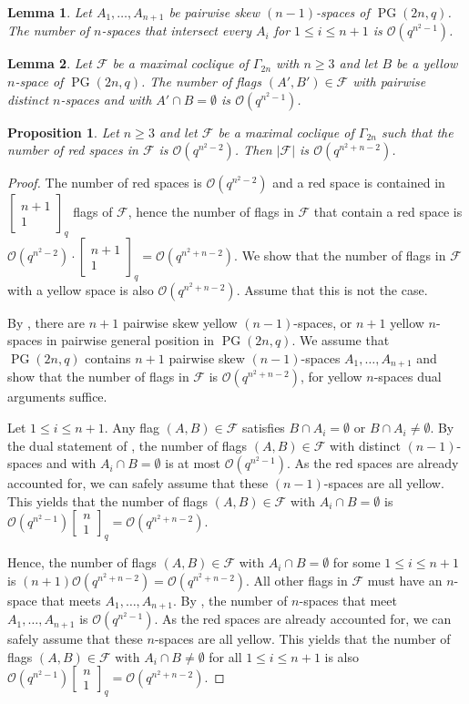 \documentclass[10pt,a4paper]{amsart}
\newtheorem{lemma}{Lemma}
\newtheorem{prop}{Proposition}
\newcommand{\EKR}{\mathcal{F}}
\newcommand{\Gauss}[2]{{\begin{bmatrix} #1 \\ #2 \end{bmatrix}_q}}
\newcommand{\OO}{\mathcal{O}}
\DeclareMathOperator{\PG}{PG}
\begin{document}
\begin{lemma} \label{L: few that meet all}
 Let $A_1,\ldots,A_{n+1}$ be pairwise skew $(n-1)$-spaces of $\PG(2n,q)$. The number of $n$-spaces that intersect every $A_i$ for $1\leq i\leq n+1$ is $\OO(q^{n^2-1})$.
\end{lemma}

\begin{lemma} \label{L: yellows meet almost all}
    Let $\EKR$ be a maximal coclique of $\Gamma_{2n}$ with $n\geq 3$ and let $B$ be a yellow $n$-space of $\PG(2n,q)$. The number of flags $(A',B')\in \EKR$ with pairwise distinct $n$-spaces and with $A'\cap B=\emptyset$ is $\OO(q^{n^2-1})$.
\end{lemma}

\begin{prop}
Let $n\geq 3$ and let $\EKR$ be a maximal coclique of $\Gamma_{2n}$ such that the number of red spaces in $\EKR$ is $\OO(q^{n^2-2})$. Then $|\EKR|$ is $\OO(q^{n^2+n-2})$.
\end{prop}

\begin{proof}
 The number of red spaces is $\OO(q^{n^2-2})$ and a red space is contained in $\Gauss{n+1}{1}$ flags of $\EKR$, hence the number of flags in $\EKR$ that contain a red space is $\OO(q^{n^2-2})\cdot \Gauss{n+1}{1}=\OO(q^{n^2+n-2})$. 
   We show that the number of flags in $\EKR$ with a yellow space is also $\OO(q^{n^2+n-2})$. Assume that this is not the case.

     By , there are $n+1$ pairwise skew yellow $(n-1)$-spaces, or $n+1$ yellow $n$-spaces in pairwise general position in $\PG(2n,q)$. We assume that $\PG(2n,q)$ contains $n+1$ pairwise skew $(n-1)$-spaces $A_1,\ldots,A_{n+1}$ and show that the number of flags in $\EKR$ is $\OO(q^{n^2+n-2})$, for yellow $n$-spaces dual arguments suffice.
     
     Let $1\leq i\leq n+1$. 
     Any flag $(A,B)\in \EKR$ satisfies $B\cap A_i=\emptyset$ or $B\cap A_i\neq\emptyset$.
     By the dual statement of , the number of flags $(A,B)\in \EKR$ with distinct $(n-1)$-spaces and with $A_i\cap B=\emptyset$ is at most $\OO(q^{n^2-1})$. As the red spaces are already accounted for, we can safely assume that these $(n-1)$-spaces are all yellow. This yields that the number of flags $(A,B)\in \EKR$ with $A_i\cap B=\emptyset$ is $\OO(q^{n^2-1})\Gauss{n}{1}=\OO(q^{n^2+n-2})$. 
     
     Hence, the number of flags $(A,B)\in \EKR$ with $A_i\cap B=\emptyset$ for some $1\leq i\leq n+1$ is $(n+1)\OO(q^{n^2+n-2})=\OO(q^{n^2+n-2})$. All other flags in $\EKR$ must have an $n$-space that meets $A_1,\ldots,A_{n+1}$. By , the number of $n$-spaces that meet $A_1,\ldots,A_{n+1}$ is $\OO(q^{n^2-1})$. As the red spaces are already accounted for, we can safely assume that these $n$-spaces are all yellow. This yields that the number of flags $(A,B)\in \EKR$ with $A_i\cap B\neq\emptyset$ for all $1\leq i\leq n+1$  is also $\OO(q^{n^2-1})\Gauss{n}{1}=\OO(q^{n^2+n-2})$. 
\end{proof}
\end{document}
